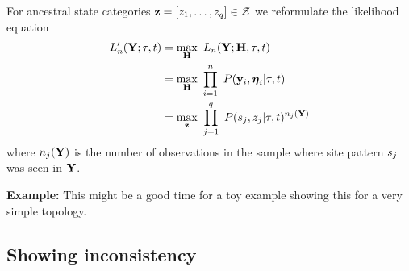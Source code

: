 \documentclass[a4paper]{article}
\begin{document}
For ancestral state categories $\mathbf{z}=[z_1,\ldots,z_q]\in\mathcal{Z}$ we reformulate the likelihood equation
\begin{align}
L_n'(\mathbf{Y};\tau, t) &= \max_{\mathbf{H}} \ L_n(\mathbf{Y};\mathbf{H}, \tau, t) \\
                             &= \max_{\mathbf{H}} \ \prod_{i=1}^{n} \ P(\mathbf{y}_i, \boldsymbol\eta_i | \tau, t) \\
                             &= \max_{\mathbf{z}} \ \prod_{j=1}^{q} \ P(s_j, z_j | \tau, t)^{n_j(\mathbf{Y})} \label{eq:site_pattern_likelihood}
\end{align}
where $n_j(\mathbf{Y})$ is the number of observations in the sample where site pattern $s_j$ was seen in $\mathbf{Y}$.

\textbf{Example:} This might be a good time for a toy example showing this for a very simple topology.


\subsection{Showing inconsistency}
\end{document}
